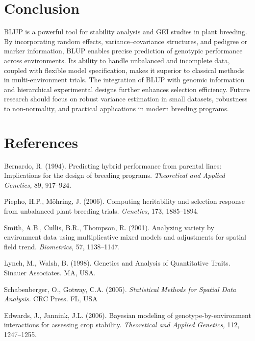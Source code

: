 \documentclass[
]{article}
\begin{document}
\hypertarget{conclusion}{%
\section{Conclusion}\label{conclusion}}

BLUP is a powerful tool for stability analysis and GEI studies in plant
breeding. By incorporating random effects, variance--covariance
structures, and pedigree or marker information, BLUP enables precise
prediction of genotypic performance across environments. Its ability to
handle unbalanced and incomplete data, coupled with flexible model
specification, makes it superior to classical methods in
multi-environment trials. The integration of BLUP with genomic
information and hierarchical experimental designs further enhances
selection efficiency. Future research should focus on robust variance
estimation in small datasets, robustness to non-normality, and practical
applications in modern breeding programs.

\hypertarget{references}{%
\section{References}\label{references}}

Bernardo, R. (1994). Predicting hybrid performance from parental lines:
Implications for the design of breeding programs. \emph{Theoretical and
Applied Genetics,} 89, 917--924.

Piepho, H.P., Möhring, J. (2006). Computing heritability and selection
response from unbalanced plant breeding trials. \emph{Genetics,} 173,
1885--1894.

Smith, A.B., Cullis, B.R., Thompson, R. (2001). Analyzing variety by
environment data using multiplicative mixed models and adjustments for
spatial field trend. \emph{Biometrics,} 57, 1138--1147.

Lynch, M., Walsh, B. (1998). Genetics and Analysis of Quantitative
Traits. Sinauer Associates. MA, USA.

Schabenberger, O., Gotway, C.A. (2005). \emph{Statistical Methods for
Spatial Data Analysis.} CRC Press. FL, USA

Edwards, J., Jannink, J.L. (2006). Bayesian modeling of
genotype-by-environment interactions for assessing crop stability.
\emph{Theoretical and Applied Genetics,} 112, 1247--1255.
\end{document}
